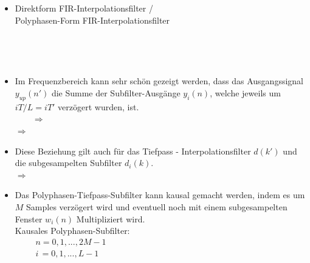 		\begin{itemize}
		 \item Direktform FIR-Interpolationsfilter / \\Polyphasen-Form FIR-Interpolationsfilter\\[-0.7cm]
			\hspace*{-1.9cm}\begin{minipage}{0.4\textwidth}
			\\
			\end{minipage}
			\begin{minipage}{0.5\textwidth}
			
			\end{minipage}\\[-0.6cm]
		 \item Im Frequenzbereich kann sehr schön gezeigt werden, dass das Ausgangssignal $y_{up}(n')$ die Summe der Subfilter-Ausgänge $y_i(n)$, welche jeweils um $iT/L = iT'$ verzögert wurden, ist.\\[0.2cm]
		 \hspace*{2.15cm}$\qquad\Rightarrow\qquad$\\[0.2cm]
		 \hspace*{1cm}$\Rightarrow\qquad$\\[-0.1cm]
		 \item Diese Beziehung gilt auch für das Tiefpass - Interpolationsfilter $d(k')$ und die subgesampelten Subfilter $d_i(k)$.\\[-0.1cm]
		 \hspace*{1cm}$\Rightarrow\qquad$
		 \item Das Polyphasen-Tiefpass-Subfilter kann kausal gemacht werden, indem es um $M$ Samples verzögert wird und eventuell noch mit einem subgesampelten Fenster $w_i(n)$ Multipliziert wird.\\[0.2cm]
		 \hspace*{1cm}Kausales Polyphasen-Subfilter: \\
		 \hspace*{1cm}$\qquad\begin{array}{l}n = 0,1,...,2M-1\\ i\, = 0,1,...,L-1\end{array}$\\[0.1cm]

\end{itemize}
